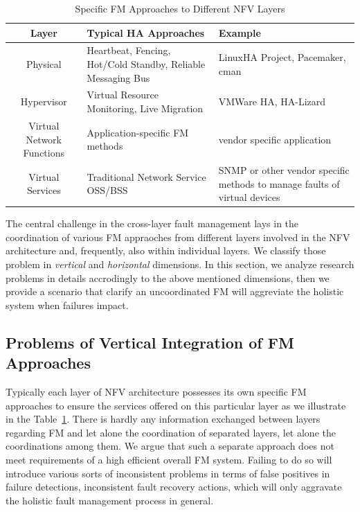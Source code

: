 \label{problemstatement}

\begin{table}[!t]
\centering
\caption{Specific FM Approaches to Different NFV Layers}
\label{tbl:layers}
	\begin{tabular}{c|p{3cm}|p{5cm}}
		\hline
		\textbf{Layer} & \textbf{Typical HA Approaches} & \textbf{Example}\\
		\hline
		\hline
		Physical	&	Heartbeat, Fencing, Hot/Cold Standby, Reliable Messaging Bus &
LinuxHA Project, Pacemaker, cman \\
		Hypervisor & Virtual Resource Monitoring, Live Migration & VMWare HA, HA-Lizard \\
		Virtual Network Functions & Application-specific FM methods & vendor
specific application \\
		Virtual Services & Traditional Network Service OSS/BSS & SNMP or other
vendor specific methods to manage faults of virtual devices \\
\hline
	\end{tabular}
\end{table} 
 
The central challenge in the cross-layer fault management lays in the coordination
of various FM appraoches from different layers involved in the NFV architecture
and, frequently, also within individual layers. We classify those problem in
\emph{vertical} and \emph{horizontal} dimensions. In this section, we analyze
research problems in details accrodingly to the above mentioned dimensions,
then we provide a scenario that clarify an uncoordinated FM will aggreviate the
holistic system when failures impact. 

\subsection{Problems of Vertical Integration of FM Approaches} 

Typically each layer of NFV architecture possesses its own specific FM
approaches to ensure the services offered on this particular layer as we
illustrate in the Table~\ref{tbl:layers}. There is hardly any information
exchanged between layers regarding FM and let alone the coordination of
separated layers, let alone the coordinations among them. We argue that such a
separate approach does not meet requirements of a high efficient overall FM
system. Failing to do so will introduce various sorts of inconsistent problems
in terms of false positives in failure detections, inconsistent fault recovery
actions, which will only aggravate the holistic fault management process in general.

